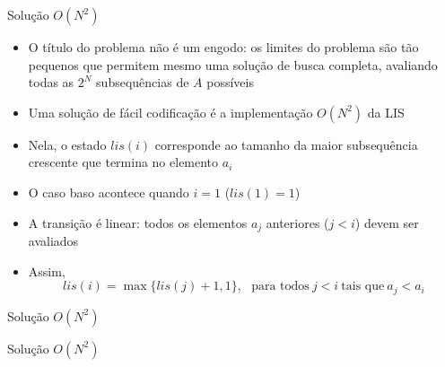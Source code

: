 \begin{frame}[fragile]{Solução $O(N^2)$}

    \begin{itemize}
        \item O título do problema não é um engodo: os limites do problema são tão pequenos
            que permitem mesmo uma solução de busca completa, avaliando todas as $2^N$
            subsequências de $A$ possíveis

        \item Uma solução de fácil codificação é a implementação $O(N^2)$ da LIS

        \item Nela, o estado $lis(i)$ corresponde ao tamanho da maior subsequência crescente
            que termina no elemento $a_i$

        \item O caso baso acontece quando $i = 1$ ($lis(1) = 1$)

        \item A transição é linear: todos os elementos $a_j$ anteriores ($j < i$) devem
            ser avaliados

        \item Assim,
        \[
            lis(i) = \max\{ lis(j) + 1, 1 \}, \ \ \ \mbox{para todos}\ j < i\ \mbox{tais que}\  a_j < a_i
        \]
    \end{itemize}

\end{frame}

\begin{frame}[fragile]{Solução $O(N^2)$}
\end{frame}

\begin{frame}[fragile]{Solução $O(N^2)$}
\end{frame}
